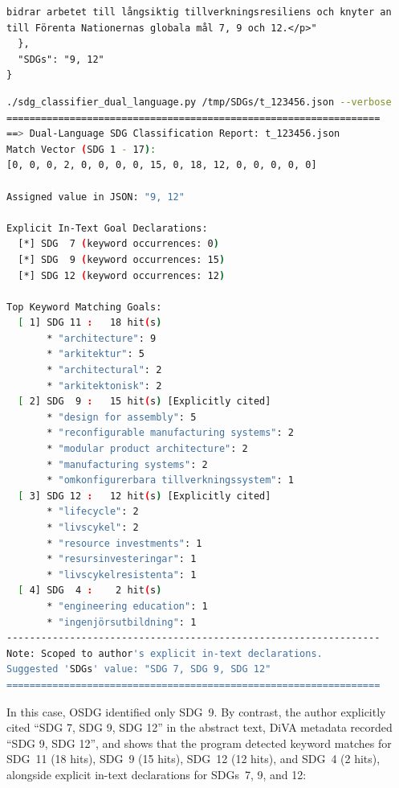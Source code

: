 \begin{casestudySection}
\begin{lstlisting}
bidrar arbetet till långsiktig tillverkningsresiliens och knyter an till Förenta Nationernas globala mål 7, 9 och 12.</p>"
  },
  "SDGs": "9, 12"
}
\end{lstlisting}

\begin{lstlisting}[language={bash}, basicstyle=\footnotesize, escapechar=|, breaklines=true,
    postbreak=\usebox{\lstbreakbox}, caption={Program's output}, label=lst:123456Output]
 ./sdg_classifier_dual_language.py /tmp/SDGs/t_123456.json --verbose
=================================================================
==> Dual-Language SDG Classification Report: t_123456.json
Match Vector (SDG 1 - 17):
[0, 0, 0, 2, 0, 0, 0, 0, 15, 0, 18, 12, 0, 0, 0, 0, 0]

Assigned value in JSON: "9, 12"

Explicit In-Text Goal Declarations:
  [*] SDG  7 (keyword occurrences: 0)
  [*] SDG  9 (keyword occurrences: 15)
  [*] SDG 12 (keyword occurrences: 12)

Top Keyword Matching Goals:
  [ 1] SDG 11 :   18 hit(s)
       * "architecture": 9
       * "arkitektur": 5
       * "architectural": 2
       * "arkitektonisk": 2
  [ 2] SDG  9 :   15 hit(s) [Explicitly cited]
       * "design for assembly": 5
       * "reconfigurable manufacturing systems": 2
       * "modular product architecture": 2
       * "manufacturing systems": 2
       * "omkonfigurerbara tillverkningssystem": 1
  [ 3] SDG 12 :   12 hit(s) [Explicitly cited]
       * "lifecycle": 2
       * "livscykel": 2
       * "resource investments": 1
       * "resursinvesteringar": 1
       * "livscykelresistenta": 1
  [ 4] SDG  4 :    2 hit(s)
       * "engineering education": 1
       * "ingenjörsutbildning": 1
-----------------------------------------------------------------
Note: Scoped to author's explicit in-text declarations.
Suggested 'SDGs' value: "SDG 7, SDG 9, SDG 12"
=================================================================
\end{lstlisting}

In this case, OSDG identified only \gls{SDG}~9. By contrast, the author explicitly cited \enquote{SDG 7, SDG 9, SDG 12} in the abstract text, \gls{DiVA} metadata recorded \enquote{SDG 9, SDG 12}, and  shows that the program detected keyword matches for \gls{SDG}~11 (18 hits), \gls{SDG}~9 (15 hits), \gls{SDG}~12 (12 hits), and \gls{SDG}~4 (2 hits), alongside explicit in-text declarations for \glspl{SDG}~7, 9, and 12:


\end{casestudySection}
